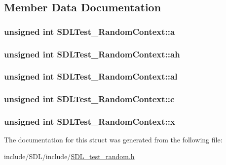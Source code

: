 \subsection{Member Data Documentation}
\hypertarget{struct_s_d_l_test___random_context_a24f830d6cb476c96fbe325c99331e45f}{
\subsubsection[{a}]{\setlength{\rightskip}{0pt plus 5cm}unsigned {\bf int} S\-D\-L\-Test\-\_\-\-Random\-Context\-::a}}\label{struct_s_d_l_test___random_context_a24f830d6cb476c96fbe325c99331e45f}
\hypertarget{struct_s_d_l_test___random_context_a2c8d2f1ee16cdfd38361b8f03b3fdb85}{
\subsubsection[{ah}]{\setlength{\rightskip}{0pt plus 5cm}unsigned {\bf int} S\-D\-L\-Test\-\_\-\-Random\-Context\-::ah}}\label{struct_s_d_l_test___random_context_a2c8d2f1ee16cdfd38361b8f03b3fdb85}
\hypertarget{struct_s_d_l_test___random_context_a0e2bccd3611d383d6510c6c828aa54c4}{
\subsubsection[{al}]{\setlength{\rightskip}{0pt plus 5cm}unsigned {\bf int} S\-D\-L\-Test\-\_\-\-Random\-Context\-::al}}\label{struct_s_d_l_test___random_context_a0e2bccd3611d383d6510c6c828aa54c4}
\hypertarget{struct_s_d_l_test___random_context_a17a6a7e7b68a33c67d9b74c8c7c33198}{
\subsubsection[{c}]{\setlength{\rightskip}{0pt plus 5cm}unsigned {\bf int} S\-D\-L\-Test\-\_\-\-Random\-Context\-::c}}\label{struct_s_d_l_test___random_context_a17a6a7e7b68a33c67d9b74c8c7c33198}
\hypertarget{struct_s_d_l_test___random_context_a8bd6d1b4e1677ed1c06f5cc09f1af5b6}{
\subsubsection[{x}]{\setlength{\rightskip}{0pt plus 5cm}unsigned {\bf int} S\-D\-L\-Test\-\_\-\-Random\-Context\-::x}}\label{struct_s_d_l_test___random_context_a8bd6d1b4e1677ed1c06f5cc09f1af5b6}


The documentation for this struct was generated from the following file\-:\begin{DoxyCompactItemize}
\item 
include/\-S\-D\-L/include/\hyperlink{_s_d_l__test__random_8h}{S\-D\-L\-\_\-test\-\_\-random.\-h}\end{DoxyCompactItemize}
